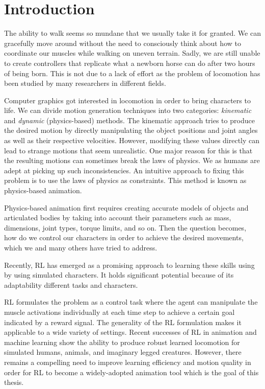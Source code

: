 
\chapter{Introduction}
\label{ch:Introduction}

The ability to walk seems so mundane that we usually take it for granted. We can gracefully move around without the need to consciously think about how to coordinate our muscles while walking on uneven terrain. Sadly, we are still unable to create controllers that replicate what a newborn horse can do after two hours of being born. This is not due to a lack of effort as the problem of locomotion has been studied by many researchers in different fields.

Computer graphics got interested in locomotion in order to bring characters to life. We can divide motion generation techniques into two categories: \textit{kinematic} and \textit{dynamic} (physics-based) methods. The kinematic approach tries to produce the desired motion by directly manipulating the object positions and joint angles as well as their respective velocities.
However, modifying these values directly can lead to strange motions that seem unrealistic. One major reason for this is that the resulting motions can sometimes break the laws of physics. We as humans are adept at picking up such inconsistencies.
An intuitive approach to fixing this problem is to use the laws of physics as constraints. This method is known as physics-based animation.


Physics-based animation first requires creating accurate models of objects and articulated bodies by taking into account their parameters such as mass, dimensions, joint types, torque limits, and so on. Then the question becomes, how do we control our characters in order to achieve the desired movements, which we and many others have tried to address.



 Recently, \ac{RL} has emerged as a promising approach to learning these skills using by using simulated characters. It holds significant potential because of its adaptability different tasks and characters.

\ac{RL} formulates the problem as a control task where the agent can manipulate the muscle activations individually at each time step to achieve a certain goal indicated by a reward signal. The generality of the \ac{RL} formulation makes it applicable to a wide variety of settings. Recent successes of \ac{RL} in animation and machine learning show the ability to produce robust learned locomotion for simulated humans, animals, and imaginary legged creatures. However, there remains a compelling need to improve learning efficiency and motion quality in order for \ac{RL} to become a widely-adopted animation tool which is the goal of this thesis.


